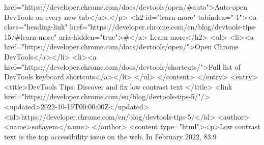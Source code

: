 href="https://developer.chrome.com/docs/devtools/open/#auto">Auto-open DevTools on every new tab</a>.</p> <h2 id="learn-more" tabindex="-1"><a class="heading-link" href="https://developer.chrome.com/en/blog/devtools-tips-15/#learn-more" aria-hidden="true">#</a> Learn more</h2> <ul> <li><a href="https://developer.chrome.com/docs/devtools/open/">Open Chrome DevTools</a></li> <li><a href="https://developer.chrome.com/docs/devtools/shortcuts/">Full list of DevTools keyboard shortcuts</a></li> </ul> </content>
</entry>
<entry>
<title>DevTools Tips: Discover and fix low contrast text </title>
<link href="https://developer.chrome.com/en/blog/devtools-tips-5/"/>
<updated>2022-10-19T00:00:00Z</updated>
<id>https://developer.chrome.com/en/blog/devtools-tips-5/</id>
<author>
<name>sofiayem</name>
</author>
<content type="html"><p>Low contrast text is the top accessibility issue on the web. In February 2022, 83.9%